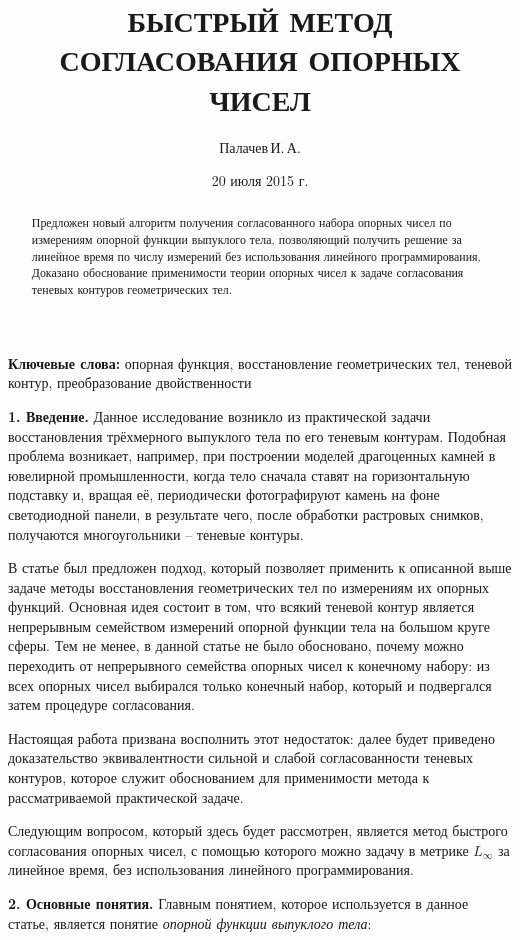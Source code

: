 \documentclass[a4paper, 10pt]{article}
\title{БЫСТРЫЙ МЕТОД СОГЛАСОВАНИЯ ОПОРНЫХ ЧИСЕЛ}
\author{Палачев\,И.\,А.}
\date{20 июля 2015 г.}
\theoremstyle{definition}
\theoremstyle{plain}
\theoremstyle{plain}
\begin{document}
\maketitle

\begin{abstract}
Предложен новый алгоритм получения согласованного набора опорных чисел по
измерениям опорной функции выпуклого тела, позволяющий получить решение за
линейное время по числу измерений без использования линейного программирования.
Доказано обоснование применимости теории опорных чисел к задаче согласования
теневых контуров геометрических тел.
\end{abstract}

\textbf{Ключевые слова:} опорная функция, восстановление геометрических тел,
теневой контур, преобразование двойственности

\textbf{1. Введение.}
Данное исследование возникло из практической задачи восстановления трёхмерного
выпуклого тела по его теневым контурам. Подобная проблема возникает, например,
при построении моделей драгоценных камней в ювелирной промышленности, когда
тело сначала ставят на горизонтальную подставку и, вращая её, периодически
фотографируют камень на фоне светодиодной панели, в результате чего, после
обработки растровых снимков, получаются многоугольники -- теневые контуры.

В статье \cite{palachev} был предложен подход, который позволяет применить к
описанной выше задаче методы восстановления геометрических тел по измерениям их
опорных функций. Основная идея состоит в том, что всякий теневой контур является
непрерывным семейством измерений опорной функции тела на большом круге сферы.
Тем не менее, в данной статье не было обосновано, почему можно переходить от
непрерывного семейства опорных чисел к конечному набору: из всех опорных чисел
выбирался только конечный набор, который и подвергался затем процедуре
согласования.

Настоящая работа призвана восполнить этот недостаток: далее будет приведено
доказательство эквивалентности сильной и слабой согласованности теневых
контуров, которое служит обоснованием для применимости метода к рассматриваемой
практической задаче.

Следующим вопросом, который здесь будет рассмотрен, является метод быстрого
согласования опорных чисел, с помощью которого можно задачу в метрике
$L_{\infty}$ за линейное время, без использования линейного программирования.

\textbf{2. Основные понятия.}
Главным понятием, которое используется в данное статье, является понятие
\textit{опорной функции выпуклого тела}:
\end{document}
